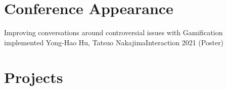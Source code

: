 \section{Conference Appearance}
\vspace{5pt}
\resumeSubHeadingListStart
    \resumeSubheading
        {Improving conversations around controversial issues with Gamification implemented}{}
        {Yong-Hao Hu, Tatsuo Nakajima}{Interaction 2021 (Poster)}
\resumeSubHeadingListEnd
\vspace{5pt}

\section{Projects}
\vspace{5pt}
